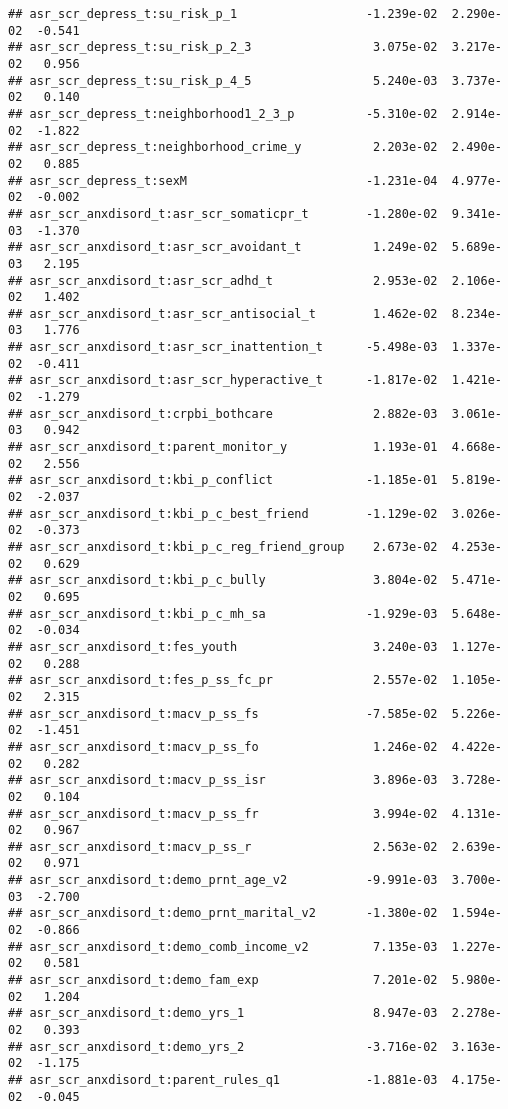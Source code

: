 \documentclass[
]{article}
\begin{document}
\begin{verbatim}
## asr_scr_depress_t:su_risk_p_1                  -1.239e-02  2.290e-02  -0.541
## asr_scr_depress_t:su_risk_p_2_3                 3.075e-02  3.217e-02   0.956
## asr_scr_depress_t:su_risk_p_4_5                 5.240e-03  3.737e-02   0.140
## asr_scr_depress_t:neighborhood1_2_3_p          -5.310e-02  2.914e-02  -1.822
## asr_scr_depress_t:neighborhood_crime_y          2.203e-02  2.490e-02   0.885
## asr_scr_depress_t:sexM                         -1.231e-04  4.977e-02  -0.002
## asr_scr_anxdisord_t:asr_scr_somaticpr_t        -1.280e-02  9.341e-03  -1.370
## asr_scr_anxdisord_t:asr_scr_avoidant_t          1.249e-02  5.689e-03   2.195
## asr_scr_anxdisord_t:asr_scr_adhd_t              2.953e-02  2.106e-02   1.402
## asr_scr_anxdisord_t:asr_scr_antisocial_t        1.462e-02  8.234e-03   1.776
## asr_scr_anxdisord_t:asr_scr_inattention_t      -5.498e-03  1.337e-02  -0.411
## asr_scr_anxdisord_t:asr_scr_hyperactive_t      -1.817e-02  1.421e-02  -1.279
## asr_scr_anxdisord_t:crpbi_bothcare              2.882e-03  3.061e-03   0.942
## asr_scr_anxdisord_t:parent_monitor_y            1.193e-01  4.668e-02   2.556
## asr_scr_anxdisord_t:kbi_p_conflict             -1.185e-01  5.819e-02  -2.037
## asr_scr_anxdisord_t:kbi_p_c_best_friend        -1.129e-02  3.026e-02  -0.373
## asr_scr_anxdisord_t:kbi_p_c_reg_friend_group    2.673e-02  4.253e-02   0.629
## asr_scr_anxdisord_t:kbi_p_c_bully               3.804e-02  5.471e-02   0.695
## asr_scr_anxdisord_t:kbi_p_c_mh_sa              -1.929e-03  5.648e-02  -0.034
## asr_scr_anxdisord_t:fes_youth                   3.240e-03  1.127e-02   0.288
## asr_scr_anxdisord_t:fes_p_ss_fc_pr              2.557e-02  1.105e-02   2.315
## asr_scr_anxdisord_t:macv_p_ss_fs               -7.585e-02  5.226e-02  -1.451
## asr_scr_anxdisord_t:macv_p_ss_fo                1.246e-02  4.422e-02   0.282
## asr_scr_anxdisord_t:macv_p_ss_isr               3.896e-03  3.728e-02   0.104
## asr_scr_anxdisord_t:macv_p_ss_fr                3.994e-02  4.131e-02   0.967
## asr_scr_anxdisord_t:macv_p_ss_r                 2.563e-02  2.639e-02   0.971
## asr_scr_anxdisord_t:demo_prnt_age_v2           -9.991e-03  3.700e-03  -2.700
## asr_scr_anxdisord_t:demo_prnt_marital_v2       -1.380e-02  1.594e-02  -0.866
## asr_scr_anxdisord_t:demo_comb_income_v2         7.135e-03  1.227e-02   0.581
## asr_scr_anxdisord_t:demo_fam_exp                7.201e-02  5.980e-02   1.204
## asr_scr_anxdisord_t:demo_yrs_1                  8.947e-03  2.278e-02   0.393
## asr_scr_anxdisord_t:demo_yrs_2                 -3.716e-02  3.163e-02  -1.175
## asr_scr_anxdisord_t:parent_rules_q1            -1.881e-03  4.175e-02  -0.045

\end{verbatim}
\end{document}
